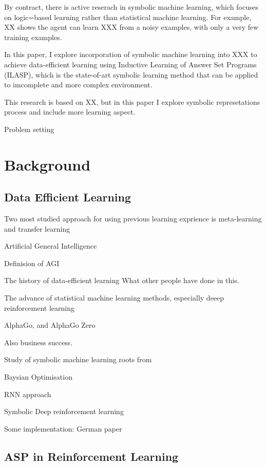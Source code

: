 \documentclass[12pt,twoside]{report}
\begin{document}
By contract, there is active reserach in symbolic machine learning, which focuses on logic=based learning rather than statistical machine learning.
For example, XX shows the agent can learn XXX from a noisy examples, with only a very few training examples.


In this paper, I explore incorporation of symbolic machine learning into XXX to achieve data-efficient learning using Inductive Learning of Answer Set Programs (ILASP), which is the state-of-art symbolic learning method that can be applied to imcomplete and more complex environment.


This research is based on XX, but in this paper I explore symbolic represetations process and include more learning aspect.


Problem setting \cite{garnelo2016towards}

\chapter{Background}

\section{Data Efficient Learning}

Two most studied approach for using previous learning exprience is meta-learning and transfer learning

Artificial General Intelligence

Definision of AGI

The history of data-efficient learning
What other people have done in this.

The advance of statistical machine learning methods, especially deeep reinforcement learning

AlphaGo, and AlphaGo Zero

Also business success.

Study of symbolic machine learning roots from

Baysian Optimisation

RNN approach

Symbolic Deep reinforcement learning

Some implementation: German paper

\section{ASP in Reinforcement Learning}
\end{document}
